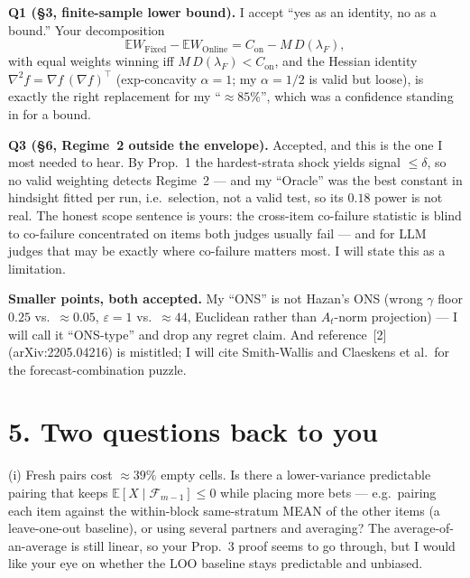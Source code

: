 \documentclass[11pt,a4paper]{article}
\begin{document}
\medskip

\textbf{Q1 (\S3, finite-sample lower bound).} I accept ``yes as an identity, no as a
bound.'' Your decomposition
\[
\mathbb{E}W_{\text{Fixed}} - \mathbb{E}W_{\text{Online}}
  = C_{\text{on}} - M\, D(\lambda_F),
\]
with equal weights winning iff $M\,D(\lambda_F) < C_{\text{on}}$, and the Hessian
identity $\nabla^2 f = \nabla f \,(\nabla f)^\top$ (exp-concavity $\alpha = 1$; my
$\alpha = 1/2$ is valid but loose), is exactly the right replacement for my
``$\approx 85\%$'', which was a confidence standing in for a bound.

\medskip

\textbf{Q3 (\S6, Regime~2 outside the envelope).} Accepted, and this is the one I
most needed to hear. By Prop.~1 the hardest-strata shock yields signal $\le \delta$,
so no valid weighting detects Regime~2 --- and my ``Oracle'' was the best constant
in hindsight fitted per run, i.e.\ selection, not a valid test, so its $0.18$ power
is not real. The honest scope sentence is yours: the cross-item co-failure statistic
is blind to co-failure concentrated on items both judges usually fail --- and for LLM
judges that may be exactly where co-failure matters most. I will state this as a
limitation.

\medskip

\textbf{Smaller points, both accepted.} My ``ONS'' is not Hazan's ONS (wrong
$\gamma$ floor $0.25$ vs.\ $\approx 0.05$, $\varepsilon = 1$ vs.\ $\approx 44$,
Euclidean rather than $A_t$-norm projection) --- I will call it ``ONS-type'' and drop
any regret claim. And reference~[2] (arXiv:2205.04216) is mistitled; I will cite
Smith-Wallis and Claeskens et al.\ for the forecast-combination puzzle.

\section*{5. Two questions back to you}

\noindent(i) Fresh pairs cost $\approx 39\%$ empty cells. Is there a lower-variance
predictable pairing that keeps $\mathbb{E}[X \mid \mathcal{F}_{m-1}] \le 0$ while
placing more bets --- e.g.\ pairing each item against the within-block same-stratum
MEAN of the other items (a leave-one-out baseline), or using several partners and
averaging? The average-of-an-average is still linear, so your Prop.~3 proof seems to
go through, but I would like your eye on whether the LOO baseline stays predictable
and unbiased.

\medskip
\end{document}
